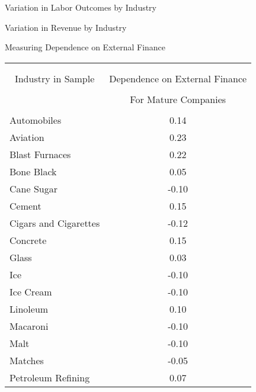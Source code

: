\documentclass[11pt]{beamer}
\begin{document}
\begin{frame}{Variation in Labor Outcomes by Industry}
\begin{figure}
\end{figure}
\end{frame}

\begin{frame}{Variation in Revenue by Industry}
\begin{figure}
\end{figure}
\end{frame}

\begin{frame}{Measuring Dependence on External Finance}
\begin{table}  \tiny{
\begin{tabular}{lc} 
\\[-1.8ex]\hline  
 \hline \\[-1.8ex] 
 \\[-1.8ex] \multicolumn{1}{c}{Industry in Sample} & \multicolumn{1}{c}{Dependence on External Finance} \\
  \\[-1.8ex] & \multicolumn{1}{c}{For Mature Companies} \\
 \hline \\[-1.8ex]                                                                             
 Automobiles & 0.14 \\  
 Aviation & 0.23 \\
 Blast Furnaces & 0.22 \\ 
 Bone Black & 0.05 \\
 Cane Sugar & -0.10 \\
 Cement & 0.15 \\
 Cigars and Cigarettes & -0.12 \\
Concrete & 0.15 \\
Glass & 0.03 \\
Ice & -0.10 \\
Ice Cream & -0.10 \\
Linoleum & 0.10 \\
Macaroni & -0.10 \\
Malt & -0.10 \\
Matches & -0.05 \\
Petroleum Refining & 0.07 \\

\end{tabular}}
\end{table}
\end{frame}
\end{document}
